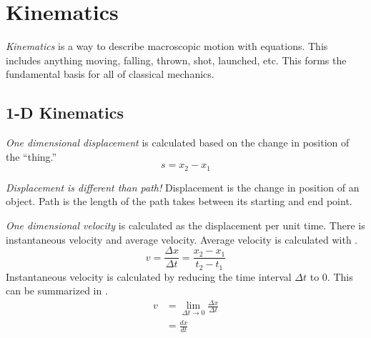\section{Kinematics}\label{sec:Kinematics}
\begin{definition}[Kinematics]\label{def:Kinematics}
  \emph{Kinematics} is a way to describe macroscopic motion with equations.
  This includes anything moving, falling, thrown, shot, launched, etc.
  This forms the fundamental basis for all of classical mechanics.
\end{definition}

\subsection{1-D Kinematics}\label{subsec:1-D Kinematics}
\begin{definition}[1-D Displacement]\label{def:1-D Displacement}
  \emph{One dimensional displacement} is calculated based on the change in position of the ``thing.''
  \begin{equation}\label{eq:1-D Displacement}
    s = x_{2} - x_{1}
  \end{equation}
  \begin{remark}
    \emph{Displacement is different than path!}
    Displacement is the change in position of an object.
    Path is the length of the path takes between its starting and end point.
  \end{remark}
\end{definition}

\begin{definition}[1-D Velocity]\label{def:1-D Velocity}
  \emph{One dimensional velocity} is calculated as the displacement per unit time.
  There is instantaneous velocity and average velocity.
  Average velocity is calculated with .
  \begin{equation}\label{eq:1-D Average Velocity}
    v = \frac{\Delta x}{\Delta t} = \frac{x_{2}-x_{1}}{t_{2}-t_{1}}
  \end{equation}
  Instantaneous velocity is calculated by reducing the time interval $\Delta t$ to 0.
  This can be summarized in .
  \begin{equation}\label{eq:1-D Instantaneous Velocity}
    \begin{aligned}
      v &= \lim\limits_{\Delta t \rightarrow 0} \frac{\Delta x}{\Delta t} \\
      &= \frac{dx}{dt}
    \end{aligned}
  \end{equation}
\end{definition}

